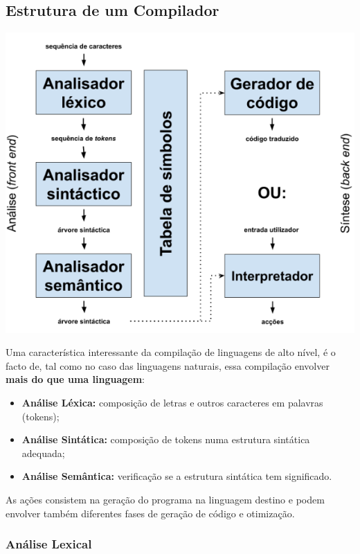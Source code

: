 \documentclass{article}
\begin{document}
\subsection{Estrutura de um Compilador}

\begin{center}
  \includegraphics[scale=0.4]{7}
\end{center}

Uma característica interessante da compilação de
linguagens de alto nível, é o facto de, tal como no caso
das linguagens naturais, essa compilação envolver \textbf{mais
do que uma linguagem}:

\begin{itemize}
  \item \textbf{Análise Léxica:} composição de letras e outros caracteres
  em palavras (tokens);
  \item \textbf{Análise Sintática:} composição de tokens numa estrutura
  sintática adequada;
  \item \textbf{Análise Semântica:} verificação se a estrutura sintática
  tem significado.
\end{itemize}

As ações consistem na geração do programa na linguagem destino e podem envolver
também diferentes fases de geração de código e otimização.

\subsubsection{Análise Lexical}
\end{document}
